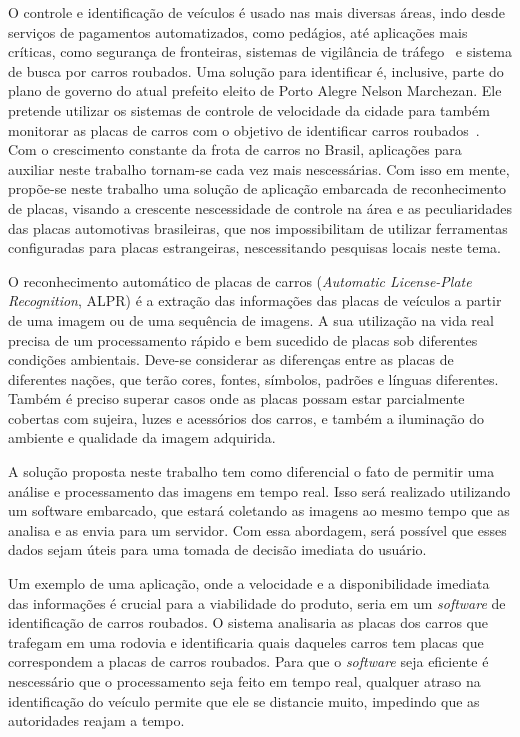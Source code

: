 O controle e identificação de veículos é usado nas mais diversas áreas, indo
desde serviços de pagamentos automatizados, como pedágios, até aplicações mais
críticas, como segurança de fronteiras, sistemas de vigilância de
tráfego~\cite{ahmad2015automatic} e sistema de busca por carros roubados.
Uma solução para identificar é, inclusive,  parte do plano de governo do atual prefeito eleito de Porto Alegre
Nelson Marchezan. Ele pretende utilizar os sistemas de controle de velocidade da cidade para também
monitorar as placas de carros com o objetivo de identificar carros roubados~\cite{psdb2016marchezan}.
Com o crescimento constante da frota de carros no Brasil, aplicações para
auxiliar neste trabalho tornam-se cada vez
mais nescessárias. Com isso em mente, propõe-se neste trabalho uma solução de
aplicação embarcada de reconhecimento de placas, visando a
crescente nescessidade de controle na área e as peculiaridades das placas
automotivas brasileiras, que nos impossibilitam de utilizar ferramentas
configuradas para placas estrangeiras, nescessitando pesquisas locais neste
tema.

O reconhecimento automático de placas de carros (\emph{Automatic License-Plate
Recognition}, ALPR) é a extração das informações das placas de veículos a partir
de uma imagem ou de uma sequência de imagens. A sua utilização na vida real
precisa de um processamento rápido e bem sucedido de placas sob diferentes
condições ambientais. Deve-se considerar as diferenças entre as placas de
diferentes nações, que terão cores, fontes, símbolos, padrões e línguas
diferentes. Também é preciso superar casos onde as placas possam estar
parcialmente cobertas com sujeira, luzes e acessórios dos
carros, e também a iluminação do ambiente e qualidade
da imagem adquirida.~\cite{s2013automatic}

A solução proposta neste trabalho tem como diferencial o fato de permitir uma
análise e processamento das imagens em tempo real. Isso será realizado
utilizando um software embarcado, que estará coletando as imagens ao mesmo tempo
que as analisa e as envia para um servidor. Com essa abordagem, será possível
que esses dados sejam úteis para uma tomada de decisão imediata do usuário.

Um exemplo de uma aplicação, onde a velocidade e a disponibilidade imediata das informações é
crucial para a viabilidade do produto, seria em um \emph{software} de identificação
de carros roubados. O sistema analisaria as placas dos carros que trafegam em uma
rodovia e identificaria quais daqueles carros tem placas que correspondem a placas
de carros roubados. Para que o \emph{software} seja eficiente é nescessário
que o processamento seja feito em tempo real, qualquer atraso na identificação do
veículo permite que ele se distancie muito, impedindo que as autoridades reajam a tempo.

